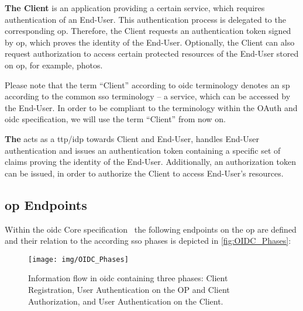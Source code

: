 \documentclass[conference,compsoc]{IEEEtran}
\begin{document}
\textbf{The Client} is an application providing a certain service, which requires authentication of an End-User.
This authentication process is delegated to the corresponding \gls{op}.
Therefore, the Client requests an authentication token signed by \gls{op}, which proves the identity of the End-User.
Optionally, the Client can also request authorization to access certain protected resources of the End-User stored on \gls{op}, for example, photos.

Please note that the term \enquote{Client} according to \gls{oidc} terminology denotes an \gls{sp} according to the common \gls{sso} terminology -- a service, which can be accessed by the End-User.
In order to be compliant to the terminology within the OAuth and \gls{oidc} specification, we will use the term \enquote{Client} from now on.

\textbf{The } acts as a \gls{ttp}/\gls{idp} towards Client and End-User, handles End-User authentication and issues an authentication token containing a specific set of claims proving the identity of the End-User.
Additionally, an authorization token can be issued, in order to authorize the Client to access End-User's resources.

\subsection{\gls{op} Endpoints}
\label{sec:basics:endpoints}

Within the \gls{oidc} Core specification~\cite{OpenIDFoundation2014} the following endpoints on the \gls{op} are defined and their relation to the according \gls{sso} phases is depicted in \autoref{fig:OIDC_Phases}:



\begin{figure*}[!ht]
	\centering
	\texttt{[image: img/OIDC\_Phases]}
	\caption{Information flow in \gls{oidc} containing three phases: Client Registration, User Authentication on the OP and Client Authorization, and User Authentication on the Client.}
	\label{fig:OIDC_Phases}
\end{figure*}
\end{document}
